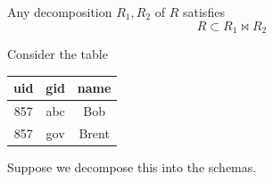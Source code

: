 \documentclass{article}
\begin{document}
    \begin{theorem}[Decomposition]
      Any decomposition $R_1, R_2$ of $R$ satisfies 
      \begin{equation}
        R \subset R_1 \bowtie R_2
      \end{equation}
    \end{theorem}

    \begin{example}[Lossy]
      Consider the table 

      \begin{table}[H]
        \centering
        \begin{tabular}{|c|c|c|}
          \hline
          \textbf{uid} & \textbf{gid} & \textbf{name} \\
          \hline
          857 & abc & Bob \\ 
          857 & gov & Brent \\
          \hline
        \end{tabular}
        \label{tab:ex1}
      \end{table}
      Suppose we decompose this into the schemas. 


\end{example}
\end{document}
